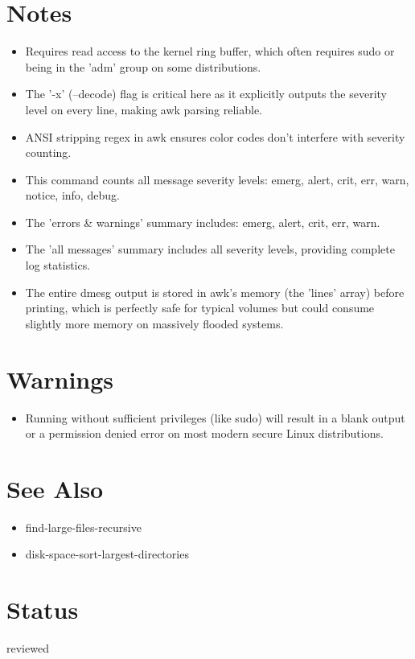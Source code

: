 \documentclass[openany]{book}
\begin{document}
\section*{Notes}
\begin{itemize}
  \item Requires read access to the kernel ring buffer, which often requires sudo or being in the 'adm' group on some distributions.
  \item The '-x' (--decode) flag is critical here as it explicitly outputs the severity level on every line, making awk parsing reliable.
  \item ANSI stripping regex in awk ensures color codes don't interfere with severity counting.
  \item This command counts all message severity levels: emerg, alert, crit, err, warn, notice, info, debug.
  \item The 'errors \& warnings' summary includes: emerg, alert, crit, err, warn.
  \item The 'all messages' summary includes all severity levels, providing complete log statistics.
  \item The entire dmesg output is stored in awk's memory (the 'lines' array) before printing, which is perfectly safe for typical volumes but could consume slightly more memory on massively flooded systems.
\end{itemize}

\section*{Warnings}
\begin{itemize}
  \item Running without sufficient privileges (like sudo) will result in a blank output or a permission denied error on most modern secure Linux distributions.
\end{itemize}

\section*{See Also}
\begin{itemize}
  \item find-large-files-recursive
  \item disk-space-sort-largest-directories
\end{itemize}

\section*{Status}
reviewed
\end{document}
